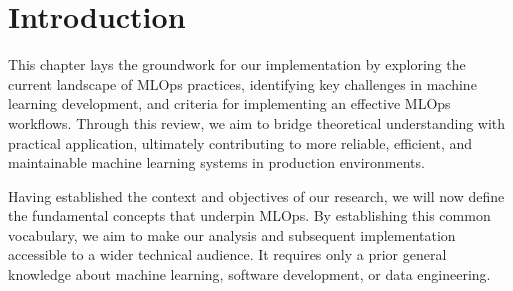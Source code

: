 \section{Introduction}\label{sec:stintro}

This chapter lays the groundwork for our implementation by exploring the current landscape of MLOps practices, identifying key challenges in machine learning development, and criteria for implementing an effective MLOps workflows.
Through this review, we aim to bridge theoretical understanding with practical application, ultimately contributing to more reliable, efficient, and maintainable machine learning systems in production environments.

Having established the context and objectives of our research, we will now define the fundamental concepts that underpin MLOps.
By establishing this common vocabulary, we aim to make our analysis and subsequent implementation accessible to a wider technical audience.
It requires only a prior general knowledge about machine learning, software development, or data engineering.